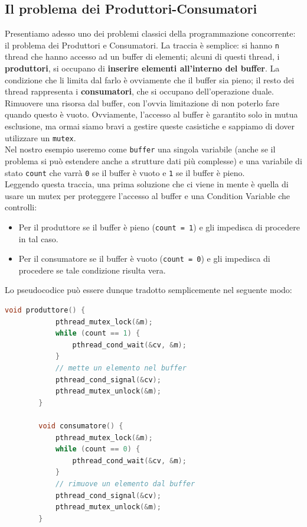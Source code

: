 \documentclass[12pt]{report}
\begin{document}
	\subsection{Il problema dei Produttori-Consumatori}
	Presentiamo adesso uno dei problemi classici della programmazione concorrente: il problema dei Produttori e Consumatori. La traccia è semplice: si hanno \texttt{n} thread che hanno accesso ad un buffer di elementi; alcuni di questi thread, i \textbf{produttori}, si occupano di \textbf{inserire elementi all'interno del buffer}. La condizione che li limita dal farlo è ovviamente che il buffer sia pieno; il resto dei thread rappresenta i \textbf{consumatori}, che si occupano dell'operazione duale. Rimuovere una risorsa dal buffer, con l'ovvia limitazione di non poterlo fare quando questo è vuoto. Ovviamente, l'accesso al buffer è garantito solo in mutua esclusione, ma ormai siamo bravi a gestire queste casistiche e sappiamo di dover utilizzare un \texttt{mutex}.\\
	Nel nostro esempio useremo come \texttt{buffer} una singola variabile (anche se il problema si può estendere anche a strutture dati più complesse) e una variabile di stato \texttt{count} che varrà \texttt{0} se il buffer è vuoto e \texttt{1} se il buffer è pieno.\\
	Leggendo questa traccia, una prima soluzione che ci viene in mente è quella di usare un mutex per proteggere l'accesso al buffer e una Condition Variable che controlli:
	\begin{itemize}
		\item Per il produttore se il buffer è pieno (\texttt{count = 1}) e gli impedisca di procedere in tal caso.
		
		\item Per il consumatore se il buffer è vuoto (\texttt{count = 0}) e gli impedisca di procedere se tale condizione risulta vera.
	\end{itemize}
	Lo pseudocodice può essere dunque tradotto semplicemente nel seguente modo:
	\begin{lstlisting}[language=C]
		void produttore() {
			pthread_mutex_lock(&m);
			while (count == 1) {
				pthread_cond_wait(&cv, &m);
			}
			// mette un elemento nel buffer
			pthread_cond_signal(&cv);
			pthread_mutex_unlock(&m);
		}
		
		void consumatore() {
			pthread_mutex_lock(&m);
			while (count == 0) {
				pthread_cond_wait(&cv, &m);
			}
			// rimuove un elemento dal buffer
			pthread_cond_signal(&cv);
			pthread_mutex_unlock(&m);
		}
	\end{lstlisting}
\end{document}

